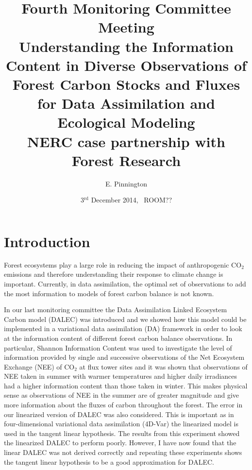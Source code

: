\documentclass[11pt]{article}
\title{Fourth Monitoring Committee Meeting\\\vspace{4mm} \normalsize{Understanding the Information Content in Diverse Observations of Forest Carbon Stocks and Fluxes for Data Assimilation and Ecological Modeling\\ NERC case partnership with Forest Research}}
\date{\normalsize{3$^{\text{rd}}$ December 2014, \ ROOM??}}
\author{\normalsize{E. Pinnington}}
\begin{document}
\maketitle

\section{Introduction}

Forest ecosystems play a large role in reducing the impact of anthropogenic CO$_2$ emissions and therefore understanding their response to climate change is important. Currently, in data assimilation, the optimal set of observations to add the most information to models of forest carbon balance is not known.  

In our last monitoring committee the Data Assimilation Linked Ecosystem Carbon model (DALEC) \cite{williams2005improved} was introduced and we showed how this model could be implemented in a variational data assimilation (DA) framework in order to look at the information content of different forest carbon balance observations. In particular, Shannon Information Content \cite{rodgers2000inverse} was used to investigate the level of information provided by single and successive observations of the Net Ecosystem Exchange (NEE) of CO$_2$ at flux tower sites and it was shown that observations of NEE taken in summer with warmer temperatures and higher daily irradiances had a higher information content than those taken in winter. This makes physical sense as observations of NEE in the summer are of greater magnitude and give more information about the fluxes of carbon throughout the forest. The error in our linearized version of DALEC was also considered. This is important as in four-dimensional variational data assimilation (4D-Var) the linearized model is used in the tangent linear hypothesis. The results from this experiment showed the linearized DALEC to perform poorly. However, I have now found that the linear DALEC was not derived correctly and repeating these experiments shows the tangent linear hypothesis to be a good approximation for DALEC. 
\end{document}
